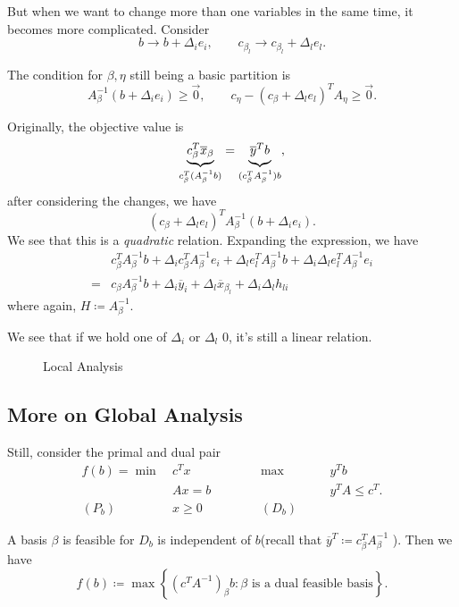 But when we want to change more than one variables in the same time, it becomes more complicated. Consider
\[
	b\to b+\Delta_{i}e_{i}, \qquad c_{\beta_l}\to c_{\beta_l} + \Delta_l e_l.
\]

The condition for \(\beta, \eta\) still being a basic partition is
\[
	A_{\beta}^{-1}(b+\Delta_{i}e_{i})\geq \vec{0}, \qquad c_{\eta} - (c_{\beta}+\Delta_l e_l)^{T}A_{\eta}\geq \vec{0}.
\]

Originally, the objective value is
\[
	\underbrace{c_{\beta}^{T} \overline{x}_{\beta}}_{c_{\beta}^{T}(A^{-1}_{\beta}b)} = \underbrace{\vphantom{c_{\beta}^{T}}\overline{y}^{T}b}_{(c_{\beta}^{T}A^{-1}_{\beta})b},
\]
after considering the changes, we have
\[
	(c_{\beta}+\Delta_l e_l)^{T}A^{-1}_{\beta}(b+\Delta_{i}e_{i}).
\]
We see that this is a \emph{quadratic} relation. Expanding the expression, we have
\[
	\begin{split}
		&c_{\beta}^{T}A^{-1}_{\beta}b + \Delta_{i}c_{\beta}^{T}A^{-1}_{\beta}e_{i}+\Delta_{l}e_{l}^{T}A^{-1}_{\beta}b+\Delta_i \Delta_l e_{l}^{T}A^{-1}_{\beta}e_{i}\\
		=& c_{\beta}A^{-1}_{\beta}b+\Delta_{i}\overline{y}_{i}+\Delta_l \overline{x}_{\beta_l}+\Delta_{i}\Delta_l h_{li}
	\end{split}
\]
where again, \(H\coloneqq A^{-1}_{\beta}\).
\begin{remark}
	We see that if we hold one of \(\Delta_i\) or \(\Delta_l\) \(0\), it's still a linear relation.
\end{remark}

\begin{figure}[H]
	\centering
	\caption{Local Analysis}
	\label{fig:local-analysis}
\end{figure}

\subsection{More on Global Analysis}
Still, consider the primal and dual pair
\[
	\begin{alignedat}{5}
		f(b) = \min~&c^{T}x\qquad\qquad&&\max ~&&y^{T}b\\
		&Ax = b 				&&		&&y^{T}A\leq c^{T}.\\
		(P_b)\quad	&x\geq  0 	&&(D_b)\quad&&
	\end{alignedat}
\]

A basis \(\beta\) is feasible for \(D_b\) is independent of \(b\)(recall that \(\overline{y}^{T}\coloneqq c_{\beta}^{T}A^{-1}_{\beta}\) ). Then we have
\[
	f(b)\coloneqq \max\left\{ (c^{T}A^{-1})_{\beta}b \colon \beta \text{ is a dual feasible basis} \right\} .
\]

